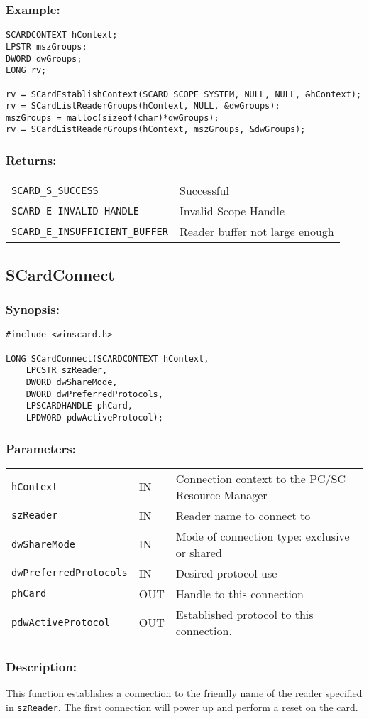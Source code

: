 \documentclass[a4paper,12pt]{article}
\newcommand{\synopsis}{\subsubsection{Synopsis:}}
\newcommand{\parameters}{\subsubsection{Parameters:}}
\newcommand{\desc}{\subsubsection{Description:}}
\newcommand{\example}{\subsubsection{Example:}}
\newcommand{\returns}{\subsubsection{Returns:}}
\begin{document}
\example
\begin{verbatim}
SCARDCONTEXT hContext;
LPSTR mszGroups;
DWORD dwGroups;
LONG rv;

rv = SCardEstablishContext(SCARD_SCOPE_SYSTEM, NULL, NULL, &hContext);
rv = SCardListReaderGroups(hContext, NULL, &dwGroups);
mszGroups = malloc(sizeof(char)*dwGroups);
rv = SCardListReaderGroups(hContext, mszGroups, &dwGroups);
\end{verbatim}

\returns

\begin{tabular}{ll}
\texttt{SCARD\_S\_SUCCESS} & Successful \\
\texttt{SCARD\_E\_INVALID\_HANDLE} & Invalid Scope Handle\\
\texttt{SCARD\_E\_INSUFFICIENT\_BUFFER} & Reader buffer not large enough
\end{tabular}


\subsection{SCardConnect}

\synopsis
\begin{verbatim}
#include <winscard.h>

LONG SCardConnect(SCARDCONTEXT hContext,
    LPCSTR szReader,
    DWORD dwShareMode,
    DWORD dwPreferredProtocols,
    LPSCARDHANDLE phCard,
    LPDWORD pdwActiveProtocol);
\end{verbatim}

\parameters

\begin{tabular}{lll}
\texttt{hContext} & IN & Connection context to the PC/SC Resource Manager\\
\texttt{szReader} & IN & Reader name to connect to\\
\texttt{dwShareMode} & IN & Mode of connection type: exclusive or shared\\
\texttt{dwPreferredProtocols} & IN & Desired protocol use\\
\texttt{phCard} & OUT & Handle to this connection\\
\texttt{pdwActiveProtocol} & OUT & Established protocol to this connection.
\end{tabular}

\desc

This function establishes a connection to the friendly name of
the reader specified in \texttt{szReader}. The first connection will
power up and perform a reset on the card.
\end{document}

